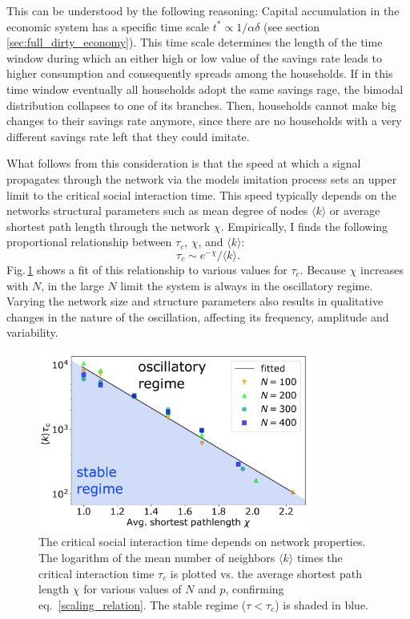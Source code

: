 This can be understood by the following reasoning: Capital accumulation in the economic system has a specific time scale $t^* \propto 1/\alpha\delta$ (see section \ref{sec:full_dirty_economy}). This time scale determines the length of the time window during which an either high or low value of the savings rate leads to higher consumption and consequently spreads among the households. If in this time window eventually all households adopt the same savings rage, the bimodal distribution collapses to one of its branches. Then, households cannot make big changes to their savings rate anymore, since there are no households with a very different savings rate left that they could imitate.

What follows from this consideration is that the speed at which a signal propagates through the network via the models imitation process sets an upper limit to the critical social interaction time. This speed typically depends on the networks structural parameters such as mean degree of nodes $\langle k \rangle$ or average shortest path length through the network $\chi$.
Empirically, I finds the following proportional relationship between $\tau_c$, $\chi$, and $\langle k \rangle$:
\begin{equation}
\tau_c \sim e^{-\chi} / \langle k \rangle.
\label{scaling_relation}
\end{equation}  
Fig.\,\ref{taucrit} shows a fit of this relationship to various values for $\tau_{c}$.  Because $\chi$ increases with $N$, in the large $N$ limit the system is always in the oscillatory regime. Varying the network size and structure parameters also results in qualitative changes in the nature of the oscillation, affecting its frequency, amplitude and variability.

\begin{figure}[t]
     \centering
       \includegraphics[width=0.8\textwidth]
       {figures/fig4.pdf}
	\caption{{The critical social interaction time depends on network properties.}
	The logarithm of the mean number of neighbors $\langle k \rangle$  times the critical interaction time $\tau_{c}$ is plotted vs. the average shortest path length $\chi$ for various values of $N$ and $p$, confirming eq.~\eqref{scaling_relation}. The stable regime ($\tau \! < \! \tau_{c}$) is shaded in blue. 
   \label{taucrit}}
\end{figure}

